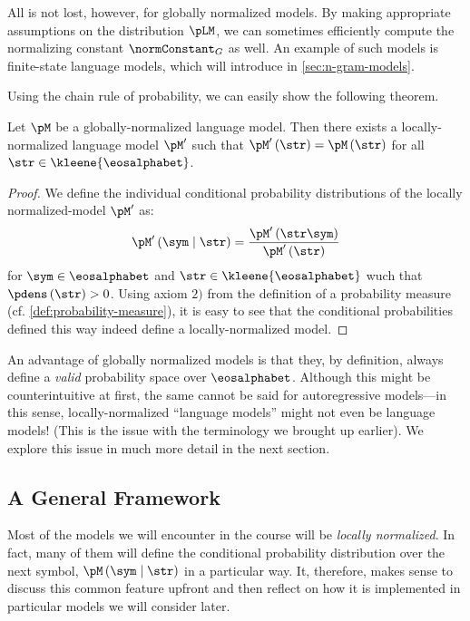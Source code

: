 All is not lost, however, for globally normalized models.
By making appropriate assumptions on the distribution $\pLM$, we can sometimes efficiently compute the normalizing constant $\normConstant_G$ as well. 
An example of such models is finite-state language models, which will introduce in \cref{sec:n-gram-models}.

Using the chain rule of probability, we can easily show the following theorem.
\begin{theorem} \label{thm:globally-normalized-is-locally-normalized}
Let $\pM$ be a globally-normalized language model.
Then there exists a locally-normalized language model $\pM'$ such that $\pM'\left(\str\right) = \pM\left(\str\right)$ for all $\str \in \kleene{\eosalphabet}$.
\end{theorem}
\begin{proof}
    We define the individual conditional probability distributions of the locally normalized-model $\pM'$ as:
    \begin{equation}
        \pM'\left(\sym\mid\str\right) = \frac{\pM'\left(\str\sym\right)}{\pM'\left(\str\right)}
    \end{equation}
    for $\sym \in \eosalphabet$ and $\str \in \kleene{\eosalphabet}$ wuch that $\pdens\left(\str\right) > 0$.
    Using axiom $2)$ from the definition of a probability measure (cf. \cref{def:probability-measure}), it is easy to see that the conditional probabilities defined this way indeed define a locally-normalized model.
\end{proof}

An advantage of globally normalized models is that they, by definition, always define a \emph{valid} probability space over $\eosalphabet$.
Although this might be counterintuitive at first, the same cannot be said for autoregressive models---in this sense, locally-normalized ``language models'' might not even be language models!
(This is the issue with the terminology we brought up earlier).
We explore this issue in much more detail in the next section.

\subsection{A General Framework} \label{sec:general-framework}
Most of the models we will encounter in the course will be \emph{locally normalized}.
In fact, many of them will define the conditional probability distribution over the next symbol, $\pM\left(\sym\mid\str\right)$ in a particular way.
It, therefore, makes sense to discuss this common feature upfront and then reflect on how it is implemented in particular models we will consider later.

